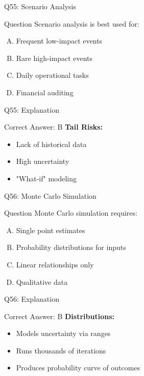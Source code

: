 \documentclass{beamer}
\begin{document}
			\begin{frame}{Q55: Scenario Analysis}
				\begin{block}{Question}
					Scenario analysis is best used for:
				\end{block}
				\begin{enumerate}[(A)]
					\item Frequent low-impact events
					\item Rare high-impact events
					\item Daily operational tasks
					\item Financial auditing
				\end{enumerate}
			\end{frame}
			\begin{frame}{Q55: Explanation}
				\begin{block}{Correct Answer: B}
					\textbf{Tail Risks:}
					\begin{itemize}
						\item Lack of historical data
						\item High uncertainty
						\item "What-if" modeling
					\end{itemize}
				\end{block}
			\end{frame}
			
			\begin{frame}{Q56: Monte Carlo Simulation}
				\begin{block}{Question}
					Monte Carlo simulation requires:
				\end{block}
				\begin{enumerate}[(A)]
					\item Single point estimates
					\item Probability distributions for inputs
					\item Linear relationships only
					\item Qualitative data
				\end{enumerate}
			\end{frame}
			\begin{frame}{Q56: Explanation}
				\begin{block}{Correct Answer: B}
					\textbf{Distributions:}
					\begin{itemize}
						\item Models uncertainty via ranges
						\item Runs thousands of iterations
						\item Produces probability curve of outcomes
					\end{itemize}
				\end{block}
			\end{frame}
			
\end{document}

